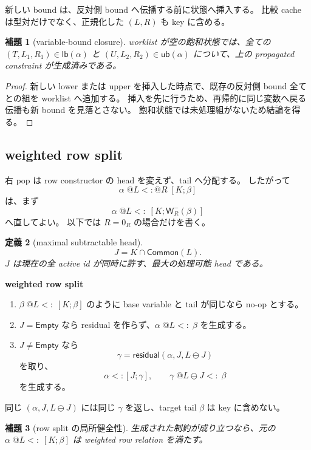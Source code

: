 \documentclass[uplatex,dvipdfmx,a4paper,10.5pt]{jsarticle}
\makeatletter
\theoremstyle{jpplain}
\newtheorem{definition}{定義}[section]
\newtheorem{lemma}[definition]{補題}
\newcommand{\Empty}{\mathsf{Empty}}
\newcommand{\lb}{\mathsf{lb}}
\newcommand{\ub}{\mathsf{ub}}
\newcommand{\resid}{\mathsf{residual}}
\newcommand{\Common}{\mathsf{Common}}
\newcommand{\NWeight}[2]{\mathsf{W}^{-}_{#1}(#2)}
\newcommand{\row}[2]{[#1;#2]}
\newcommand{\wsub}[4]{#1\;@#2\mathrel{<:}@#3\;#4}
\newcommand{\lsub}[3]{#1\;@#2\mathrel{<:}\;#3}
\newcommand{\subty}[2]{#1\mathrel{<:}#2}
\makeatother
\begin{document}
新しい bound は、反対側 bound へ伝播する前に状態へ挿入する。
比較 cache は型対だけでなく、正規化した $(L,R)$ も key に含める。

\begin{lemma}[variable-bound closure]
worklist が空の飽和状態では、全ての
$(T,L_1,R_1)\in\lb(\alpha)$ と
$(U,L_2,R_2)\in\ub(\alpha)$ について、上の propagated constraint が生成済みである。
\end{lemma}

\begin{proof}
新しい lower または upper を挿入した時点で、既存の反対側 bound 全てとの組を worklist へ追加する。
挿入を先に行うため、再帰的に同じ変数へ戻る伝播も新 bound を見落とさない。
飽和状態では未処理組がないため結論を得る。
\end{proof}

\subsection{weighted row split}\label{sec:row-split}

右 pop は row constructor の head を変えず、tail へ分配する。
したがって
\[
  \wsub{\alpha}{L}{R}{\row{K}{\beta}}
\]
は、まず
\[
  \lsub{\alpha}{L}{\row{K}{\NWeight{R}{\beta}}}
\]
へ直してよい。
以下では $R=0_R$ の場合だけを書く。

\begin{definition}[maximal subtractable head]
\[
  J=K\cap\Common(L).
\]
$J$ は現在の全 active id が同時に許す、最大の処理可能 head である。
\end{definition}

\begin{formalbox}
\textbf{weighted row split}

\begin{enumerate}
  \item $\lsub{\beta}{L}{\row{K}{\beta}}$ のように base variable と tail が同じなら no-op とする。
  \item $J=\Empty$ なら residual を作らず、$\lsub{\alpha}{L}{\beta}$ を生成する。
  \item $J\neq\Empty$ なら
  \[
    \gamma=\resid(\alpha,J,L\ominus J)
  \]
  を取り、
  \[
    \subty{\alpha}{\row{J}{\gamma}},
    \qquad
    \lsub{\gamma}{L\ominus J}{\beta}
  \]
  を生成する。
\end{enumerate}
同じ $(\alpha,J,L\ominus J)$ には同じ $\gamma$ を返し、target tail $\beta$ は key に含めない。
\end{formalbox}

\begin{lemma}[row split の局所健全性]
生成された制約が成り立つなら、元の
$\lsub{\alpha}{L}{\row{K}{\beta}}$ は weighted row relation を満たす。
\end{lemma}
\end{document}

